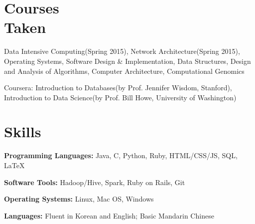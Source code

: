 \documentclass[11pt,margin,line]{cv}
\begin{document}
\begin{resume}
    \section{\mysidestyle Courses\\Taken}
    \begin{list3}
      \item Data Intensive Computing(Spring 2015), Network Architecture(Spring 2015), Operating Systems, Software Design \& Implementation, Data Structures, Design and Analysis of Algorithms, Computer Architecture, Computational Genomics
      \vspace{1mm}
      \item Coursera: Introduction to Databases(by Prof. Jennifer Wisdom, Stanford),  Introduction to Data Science(by Prof. Bill Howe, University of Washington)
    \end{list3}

    \section{\mysidestyle Skills}
    \begin{list3}
        \item\textbf{Programming Languages:} Java, C, Python, Ruby, HTML/CSS/JS, SQL, \LaTeX
        \item\textbf{Software Tools:}  Hadoop/Hive, Spark, Ruby on Rails, Git
        \item\textbf{Operating Systems:} Linux, Mac OS, Windows
        \item\textbf{Languages:} Fluent in Korean and English; Basic Mandarin Chinese
    \end{list3}

\end{resume}
\end{document}
